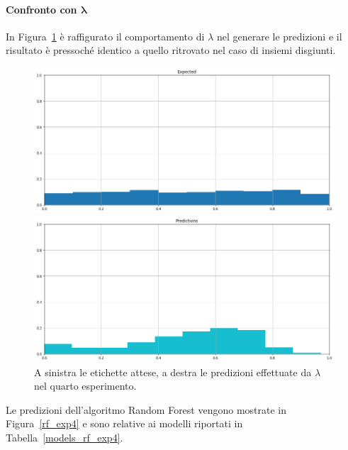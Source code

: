 \documentclass[12pt]{report}
\theoremstyle{definition}
\begin{document}
\paragraph{Confronto con $\bm{\lambda}$}
In Figura~\ref{prediction_exp4} è raffigurato il comportamento di $\lambda$ nel generare le predizioni e il risultato è pressoché identico a quello ritrovato nel caso di insiemi disgiunti.
\begin{figure}
\centering
    \begin{minipage}{0.48\textwidth}
        \includegraphics[width=\linewidth]{images/experiment_uniform_sovrapposti/expected_memberships.png}
    \end{minipage}
    \begin{minipage}{0.48\textwidth}
        \includegraphics[width=\linewidth]{images/experiment_uniform_sovrapposti/prediction_memberships.png}
    \end{minipage}
    \caption{A sinistra le etichette attese, a destra le predizioni effettuate da $\lambda$ nel quarto esperimento.}
    \label{prediction_exp4}
\end{figure} 
Le predizioni dell'algoritmo Random Forest vengono mostrate in Figura~\ref{rf_exp4} e sono relative ai modelli riportati in Tabella~\ref{models_rf_exp4}.
\end{document}
